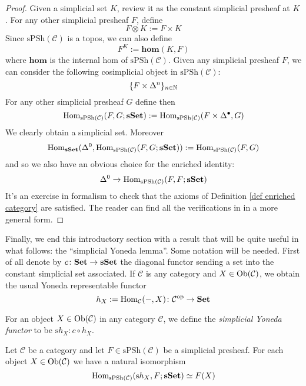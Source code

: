 \begin{refsection}
\begin{proof}
Given a simplicial set $K$, review it as the constant simplicial presheaf at $K$. For any other simplicial presheaf $F$, define
\[
F \otimes K := F \times K
\]
Since $\mathrm{sPSh}(\mathcal C)$ is a topos, we can also define
\[
F^K := \mathbf{hom}(K,F)
\]
where $\mathbf{hom}$ is the internal hom of $\mathrm{sPSh}(\mathcal C)$. Given any simplicial presheaf $F$, we can consider the following cosimplicial object in $\mathrm{sPSh}(\mathcal C)$:
\[
\{F \times \Delta^n\}_{n \in \mathbb{N}}
\]
For any other simplicial presheaf $G$ define then
\[
\mathrm{Hom}_{\mathrm{sPSh}(\mathcal C)} (F,G;\mathbf{sSet}) := \mathrm{Hom}_{\mathrm{sPSh}(\mathcal C)}(F \times \Delta^\bullet,G)
\]
We clearly obtain a simplicial set. Moreover
\[
\mathrm{Hom}_{\mathbf{sSet}}(\Delta^0, \mathrm{Hom}_{\mathrm{sPSh}(\mathcal C)} (F,G;\mathbf{sSet})) := \mathrm{Hom}_{\mathrm{sPSh}(\mathcal C)}(F,G)
\]
and so we also have an obvious choice for the enriched identity:
\[
\Delta^0 \to \mathrm{Hom}_{\mathrm{sPSh}(\mathcal C)}(F,F;\mathbf{sSet})
\]
It's an exercise in formalism to check that the axioms of Definition \ref{def enriched category} are satisfied. The reader can find all the verifications in \cite[Lemma II.2.4]{gj} in a more general form.
\end{proof}

Finally, we end this introductory section with a result that will be quite useful in what follows: the ``simplicial Yoneda lemma''. Some notation will be needed. First of all denote by $c \colon \mathbf{Set} \to \mathbf{sSet}$ the diagonal functor sending a set into the constant simplicial set associated. If $\mathcal C$ is any category and $X \in \mathrm{Ob}(\mathcal C)$, we obtain the usual Yoneda representable functor
\[
h_X := \mathrm{Hom}_{\mathcal C}(-,X) \colon \mathcal C^{\mathrm{op}} \to \mathbf{Set}
\]

\begin{defin}
For an object $X \in \mathrm{Ob}(\mathcal C)$ in any category $\mathcal C$, we define the \emph{simplicial Yoneda functor} to be $\mathrm sh_X \colon c \circ h_X$.
\end{defin}

\begin{thm} \label{thm simplicial yoneda}
Let $\mathcal C$ be a category and let $F \in \mathrm{sPSh}(\mathcal C)$ be a simplicial presheaf. For each object $X \in \mathrm{Ob}(\mathcal C)$ we have a natural isomorphism
\[
\mathrm{Hom}_{\mathrm{sPSh}(\mathcal C)}(\mathrm sh_X,F;\mathbf{sSet}) \simeq F(X)
\]
\end{thm}


\end{refsection}
